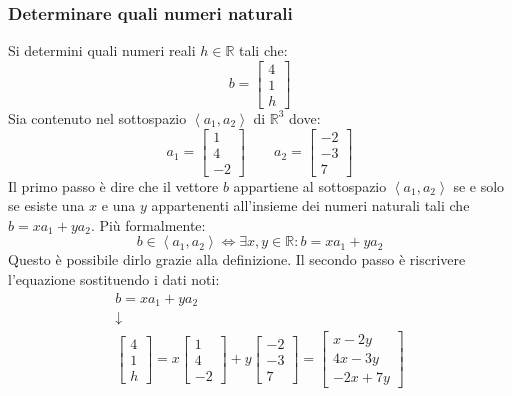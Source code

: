 \documentclass[a4paper]{article}
\begin{document}
	\subsubsection{Determinare quali numeri naturali}
	
	Si determini quali numeri reali $h \in \mathbb{R}$ tali che:
	\begin{equation*}
		b = \begin{bmatrix}
			4 \\
			1 \\
			h
		\end{bmatrix}
	\end{equation*}
	Sia contenuto nel sottospazio $\left\langle a_{1}, a_{2} \right\rangle$ di $\mathbb{R}^{3}$ dove:
	\begin{equation*}
		a_{1} = \begin{bmatrix}
			1 \\
			4 \\
			-2
		\end{bmatrix} \hspace{2em}
		a_{2} = \begin{bmatrix}
			-2 \\
			-3 \\
			7
		\end{bmatrix}
	\end{equation*}
	Il \textcolor{Red3}{primo passo} è dire che il vettore $b$ appartiene al sottospazio $\left\langle a_{1}, a_{2} \right\rangle$ se e solo se esiste una $x$ e una $y$ appartenenti all'insieme dei numeri naturali tali che $b = xa_{1} + ya_{2}$. Più formalmente:
	\begin{equation*}
		b \in \left\langle a_{1}, a_{2} \right\rangle \iff \exists x,y \in \mathbb{R} : b = xa_{1} + ya_{2}
	\end{equation*}
	Questo è possibile dirlo grazie alla definizione. Il \textcolor{Red3}{secondo passo} è riscrivere l'equazione sostituendo i dati noti:
	\begin{gather*}
		b = xa_{1} + ya_{2} \\
		\downarrow \\
		\begin{bmatrix}
			4 \\
			1 \\
			h
		\end{bmatrix} =
		x \begin{bmatrix}
			1 \\
			4 \\
			-2
		\end{bmatrix} +
		y \begin{bmatrix}
			-2 \\
			-3 \\
			7
		\end{bmatrix} =
		\begin{bmatrix}
			x - 2y  \\
			4x - 3y \\
			-2x + 7y
		\end{bmatrix}
	\end{gather*}
\end{document}

